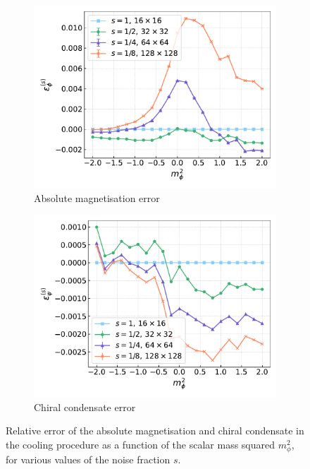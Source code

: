 \begin{figure}[htp]
    \centering
    \begin{subfigure}[b]{0.47\textwidth}
        \includegraphics[width=1.0\textwidth]{figures/cooling/mass_scan/deviation.pdf}
        \caption{Absolute magnetisation error}
    \end{subfigure}
    \begin{subfigure}[b]{0.47\textwidth}
        \includegraphics[width=1.0\textwidth]{figures/cooling/mass_scan/deviation_cond.pdf}
        \caption{Chiral condensate error}
    \end{subfigure}
    \caption[Relative error in the cooling procedure at tree level as a function of the scalar mass squared.]{Relative error of the absolute magnetisation and chiral condensate in the cooling procedure as a function of the scalar mass squared $m_\phi^2$, for various values of the noise fraction $s$.}
    \label{fig:cooling_deviation}
\end{figure}
